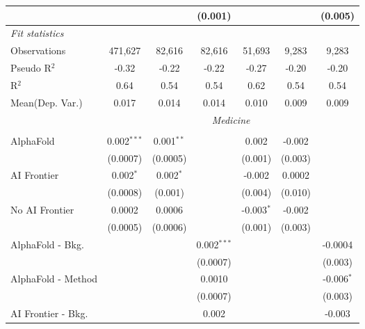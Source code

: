 \begin{tabular}{lcccccc}
                           &               &               & (0.001)  &          &             & (0.005)\\   
   \midrule
   \emph{Fit statistics}\\
   Observations            & 471,627       & 82,616        & 82,616   & 51,693   & 9,283       & 9,283\\  
   Pseudo R$^2$            & -0.32         & -0.22         & -0.22    & -0.27    & -0.20       & -0.20\\  
   R$^2$                   & 0.64          & 0.54          & 0.54     & 0.62     & 0.54        & 0.54\\  
   
Mean(Dep. Var.) & 0.017 & 0.014 & 0.014 & 0.010 & 0.009 & 0.009 \\
 & \multicolumn{6}{c}{\textit{Medicine}} \\ \\
   AlphaFold               & 0.002$^{***}$ & 0.001$^{**}$ &               & 0.002        & -0.002  &   \\   
                           & (0.0007)      & (0.0005)     &               & (0.001)      & (0.003) &   \\   
   AI Frontier             & 0.002$^{*}$   & 0.002$^{*}$  &               & -0.002       & 0.0002  &   \\   
                           & (0.0008)      & (0.001)      &               & (0.004)      & (0.010) &   \\   
   No AI Frontier          & 0.0002        & 0.0006       &               & -0.003$^{*}$ & -0.002  &   \\   
                           & (0.0005)      & (0.0006)     &               & (0.001)      & (0.003) &   \\   
   AlphaFold - Bkg.        &               &              & 0.002$^{***}$ &              &         & -0.0004\\   
                           &               &              & (0.0007)      &              &         & (0.003)\\   
   AlphaFold - Method      &               &              & 0.0010        &              &         & -0.006$^{*}$\\   
                           &               &              & (0.0007)      &              &         & (0.003)\\   
   AI Frontier - Bkg.      &               &              & 0.002         &              &         & -0.003\\   

\end{tabular}
